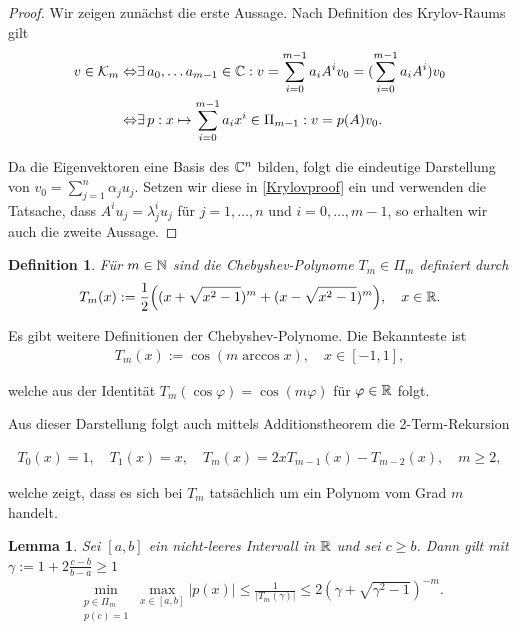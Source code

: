 \documentclass{article}
\theoremstyle{plain}
\newtheorem{lemma}      [theorem]{Lemma}
\newtheorem{definition} [theorem]{Definition}
\begin{document}
\begin{proof}
	Wir zeigen zunächst die erste Aussage. Nach Definition des Krylov-Raums gilt
	\begin{align}\label{Krylovproof}
		v \in \mathcal{K}_m \Leftrightarrow& \exists \, a_0, \dots a_{m-1} \in \mathbb{C}: v = \sum_{i=0}^{m-1} a_i A^i v_0 = (\sum_{i=0}^{m-1} a_i A^i)v_0\\
		\Leftrightarrow& \exists \, p: x \mapsto \sum_{i=0}^{m-1} a_i x^i \in \Pi_{m-1}: v = p(A)v_0.
	\end{align}

	Da die Eigenvektoren eine Basis des $\mathbb{C}^n$ bilden, folgt die eindeutige Darstellung von $v_0 = \sum_{j=1}^{n} \alpha_j u_j$. Setzen wir diese in \ref{Krylovproof} ein und verwenden die Tatsache, dass $A^i u_j = \lambda_j^i u_j$ für $j=1,\dots, n $ und $i = 0, \dots, m-1$, so erhalten wir auch die zweite Aussage.
\end{proof}


\begin{definition}
	Für $m \in \mathbb{N}$ sind die Chebyshev-Polynome $T_m \in \Pi_m$ definiert durch
	\begin{align}\label{chebyshev}
		T_m(x) := \frac{1}{2}\Big((x+ \sqrt{x^2 - 1})^m + (x- \sqrt{x^2 - 1})^m\Big), \quad x \in \mathbb{R}.
	\end{align}
\end{definition}

Es gibt weitere Definitionen der Chebyshev-Polynome. Die Bekannteste ist
\begin{align}\label{chebyalt}
	T_m(x) := \cos(m \arccos x), \quad x \in [-1,1],
\end{align}

welche aus der Identität $T_m(\cos \varphi) = \cos (m \varphi)$ für $\varphi \in \mathbb{R}$ folgt.

Aus dieser Darstellung folgt auch mittels Additionstheorem die 2-Term-Rekursion

\begin{align*}
	T_0(x) = 1, \quad T_1(x) = x, \quad T_{m}(x) = 2x T_{m-1}(x) - T_{m-2}(x), \quad m \geq 2,
\end{align*}

welche zeigt, dass es sich bei $T_m$ tatsächlich um ein Polynom vom Grad $m$ handelt.

\begin{lemma}
	\label{lem:polminmax}
	Sei $[a,b]$ ein nicht-leeres Intervall in $\mathbb{R}$ und sei $c \geq b$. Dann gilt mit $\gamma := 1 + 2 \frac{c-b}{b-a} \geq 1$
	\begin{align}\label{polminmax}
		\min_{\substack{p \in \Pi_m \\
		p(c) = 1}} \max_{x \in [a,b]} |p(x)| \leq \frac{1}{|T_m(\gamma)|} \leq 2 (\gamma + \sqrt{\gamma^2 -1})^{-m}.
	\end{align}
\end{lemma}
\end{document}

